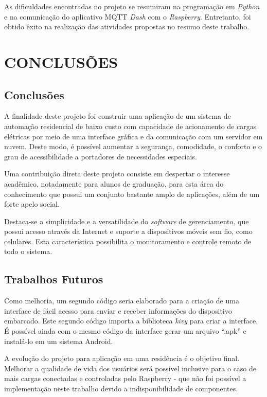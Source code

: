 \documentclass[
12pt,
openany, %
oneside, %
a4paper,			
english,			
brazil			        %
]{abntbibufjf}
\begin{document}
	
	As dificuldades encontradas no projeto se resumiram na programação em \textit{Python} e na comunicação do aplicativo MQTT \textit{Dash} com o \textit{Raspberry}. Entretanto, foi obtido êxito na realização das atividades propostas no resumo deste trabalho.
	
	
	
	\chapter{CONCLUSÕES}
	
	\section{Conclusões}
	
	A finalidade deste projeto foi construir uma aplicação de um sistema de automação residencial de baixo custo com capacidade de acionamento de cargas elétricas por meio de uma interface gráfica e da comunicação com um servidor em nuvem. Deste modo, é possível aumentar a segurança, comodidade, o conforto e o grau de acessibilidade a portadores de necessidades especiais.
	
	Uma contribuição direta deste projeto consiste em despertar o interesse acadêmico, notadamente para alunos de graduação, para esta área do conhecimento que possui um conjunto bastante amplo de aplicações, além de um forte apelo social.
	
	Destaca-se a simplicidade e a versatilidade do \textit{software} de gerenciamento, que possui acesso através da Internet e suporte a dispositivos móveis sem fio, como celulares. Esta característica possibilita o monitoramento e controle remoto de todo o sistema.
	
	
	
	\section{Trabalhos Futuros}
	
	 Como melhoria, um segundo código seria elaborado para a criação de uma interface de fácil acesso para enviar e receber informações do dispositivo embarcado. Este segundo código importa a biblioteca \textit{kivy} para criar a interface. É possível ainda com o mesmo código da interface gerar um arquivo ``.apk'' e instalá-lo em um sistema Android.
	 
	 A evolução do projeto para aplicação em uma residência é o objetivo final. Melhorar a qualidade de vida dos usuários será possível inclusive para o caso de mais cargas conectadas e controladas pelo Raspberry - que não foi possível a implementação neste trabalho devido a indisponibilidade de componentes.
	 
\end{document}
